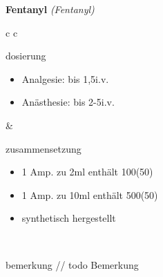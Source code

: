\begin{frame}{
    \textbf{Fentanyl}
    \textit{(Fentanyl)}
}
    \begin{tabular}{c c}
        \begin{beamercolorbox}[wd=\boxwidth\textwidth,ht=\boxheight\textheight,sep=1em]{dosierung}
            \begin{itemize}
                \item Analgesie: bis 1,5\mukgkg i.v.
                \item Anästhesie: bis 2-5\mukgkg i.v.
            \end{itemize}
        \end{beamercolorbox} & 
        \begin{beamercolorbox}[wd=\boxwidth\textwidth,ht=\boxheight\textheight,sep=1em]{zusammensetzung}
            \begin{itemize}
                \item 1 Amp. zu 2ml enthält 100\mug (50\mugml)
                \item 1 Amp. zu 10ml enthält 500\mug (50\mugml)
                \item synthetisch hergestellt
            \end{itemize}
        \end{beamercolorbox} \\
        \begin{beamercolorbox}[wd=\textwidth,ht=\boxheight\textheight,sep=1em]{bemerkung}
        // todo Bemerkung
        \end{beamercolorbox} \\
    \end{tabular}
\end{frame}